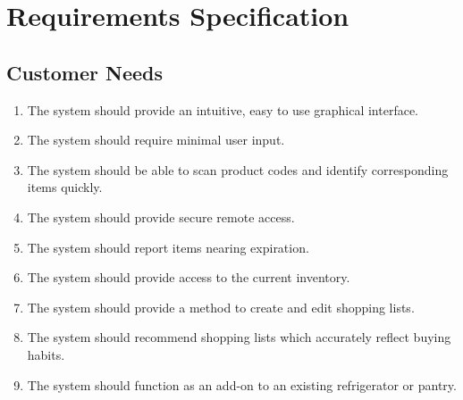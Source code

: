 \documentclass[11pt,letterpaper]{article}
\begin{document}
\section{Requirements Specification}
\subsection{Customer Needs}
\begin{enumerate}
\item The system should provide an intuitive, easy to use graphical interface.
\item The system should require minimal user input.
\item The system should be able to scan product codes and identify corresponding items quickly.
\item The system should provide secure remote access.
\item The system should report items nearing expiration.
\item The system should provide access to the current inventory.
\item The system should provide a method to create and edit shopping lists.
\item The system should recommend shopping lists which accurately reflect buying habits.
\item The system should function as an add-on to an existing refrigerator or pantry.
\end{enumerate}
\pagebreak
\end{document}
